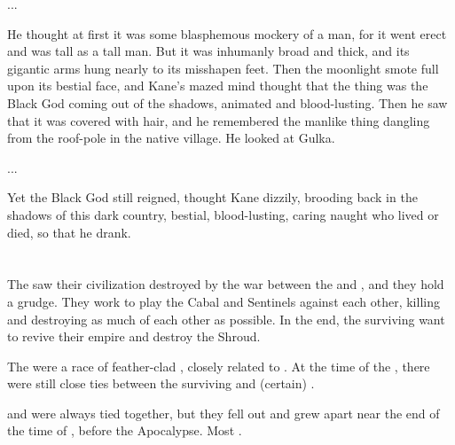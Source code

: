 {  ...

  He thought at first it was some blasphemous mockery of a man, for it went erect and was tall as a tall man. But it was inhumanly broad and thick, and its gigantic arms hung nearly to its misshapen feet. Then the moonlight smote full upon its bestial face, and Kane's mazed mind thought that the thing was the Black God coming out of the shadows, animated and blood-lusting. Then he saw that it was covered with hair, and he remembered the manlike thing dangling from the roof-pole in the native village. He looked at Gulka.

  ...

  Yet the Black God still reigned, thought Kane dizzily, brooding back in the shadows of this dark country, bestial, blood-lusting, caring naught who lived or died, so that he drank.
}















\section{\Cuezcans}
\index{\Cuezca}
The \cuezcans{} saw their civilization destroyed by the war between the \dragons{} and \banes{}, and they hold a grudge. 
They work to play the Cabal and Sentinels against each other, killing and destroying as much of each other as possible. 
In the end, the surviving \cuezcans{} want to revive their empire and destroy the Shroud. 

The \cuezcans{} were a race of feather-clad \saurians{}, closely related to \nycans. 
At the time of the \thirdbanewar, there were still close ties between the surviving \cuezcans{} and (certain) \nycans. 

\Cuezcans{} and \nycans{} were always tied together, but they fell out and grew apart near the end of the time of \Cuezca, before the Apocalypse. 
Most \nycans{} . 
















